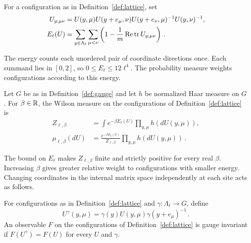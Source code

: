 \begin{definition}\label{def:plaquette}
For a configuration as in Definition~\ref{def:lattice}, set
\begin{equation}\label{eq:wilson-energy}
\begin{aligned}
U_{y;\mu\nu}&=U(y,\mu)U(y+e_\mu,\nu)U(y+e_\nu,\mu)^{-1}U(y,\nu)^{-1},\\
E_\ell(U)&=\sum_{y\in\Lambda_\ell}\sum_{\mu<\nu}
\left(1-\frac{1}{m}\operatorname{Re}\operatorname{tr} U_{y;\mu\nu}\right)\,.
\end{aligned}
\end{equation}
\end{definition}

The energy counts each unordered pair of coordinate directions once.
Each summand lies in $[0,2]$, so $0\le E_\ell\le12\ell^4$.
The probability measure weights configurations according to this energy.

\begin{definition}\label{def:wilson-law}
Let $G$ be as in Definition~\ref{def:gauge} and let $h$ be normalized Haar measure on $G$.
For $\beta\in\mathbb R$, the Wilson measure on the configurations of Definition~\ref{def:lattice} is
\begin{equation}\label{eq:wilson-law}
\begin{aligned}
Z_{\ell,\beta}&=\int e^{-\beta E_\ell(U)}\prod_{y,\mu}h(dU(y,\mu)),\\
\mu_{\ell,\beta}(dU)&=\frac{e^{-\beta E_\ell(U)}}{Z_{\ell,\beta}}\prod_{y,\mu}h(dU(y,\mu))\,.
\end{aligned}
\end{equation}
\end{definition}

The bound on $E_\ell$ makes $Z_{\ell,\beta}$ finite and strictly positive for every real $\beta$.
Increasing $\beta$ gives greater relative weight to configurations with smaller energy.
Changing coordinates in the internal matrix space independently at each site acts as follows.

\begin{definition}\label{def:gauge-transform}
For configurations as in Definition~\ref{def:lattice} and $\gamma:\Lambda_\ell\to G$, define
\begin{equation}\label{eq:gauge-transform}
U^\gamma(y,\mu)=\gamma(y)U(y,\mu)\gamma(y+e_\mu)^{-1}\,.
\end{equation}
An observable $F$ on the configurations of Definition~\ref{def:lattice} is gauge invariant if $F(U^\gamma)=F(U)$ for every $U$ and $\gamma$.
\end{definition}

